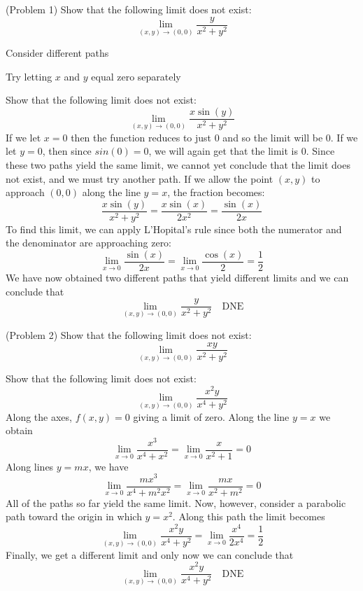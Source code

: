 \documentclass[handout]{ximera}
\begin{document}
\begin{problem}(Problem 1)
Show that the following limit does not exist:
\[
\lim_{(x,y) \to (0,0)} \frac{y}{x^2 + y^2}
\]
\begin{hint}
Consider different paths
\end{hint}
\begin{hint}
Try letting $x$ and $y$ equal zero separately
\end{hint}
\end{problem}

\begin{example}[Example 2]
Show that the following limit does not exist:
\[
\lim_{(x,y) \to (0,0)} \frac{x\sin(y)}{x^2 + y^2}
\]
If we let $x = 0$ then the function reduces to just $0$ and so the limit will be $0$. If we let $y = 0$, then since $sin (0) = 0$, we will again get that the limit is $0$.
Since these two paths yield the same limit, we cannot yet conclude that the limit does not exist, and we must try another path.
If we allow the point $(x,y)$ to approach $(0,0)$ along the line $y = x$, the fraction becomes:
\[
\frac{x\sin(y)}{x^2 + y^2} = \frac{x\sin(x)}{2x^2} = \frac{\sin(x)}{2x}
\]
To find this limit, we can apply L'Hopital's rule since both the numerator and the denominator are approaching zero:
\[
\lim_{x \to 0} \frac{\sin(x)}{2x} = \lim_{x \to 0} \frac{\cos(x)}{2} = \frac12
\]
We have now obtained two different paths that yield different limits and we can conclude that
\[
\lim_{(x,y) \to (0,0)} \frac{y}{x^2 + y^2} \quad \text{DNE}
\]
\end{example}

\begin{problem}(Problem 2)
Show that the following limit does not exist:
\[
\lim_{(x,y) \to (0,0)} \frac{xy}{x^2 + y^2}
\]
\end{problem}

\begin{example}[Example 3]
Show that the following limit does not exist:
\[
\lim_{(x,y) \to (0,0)} \frac{x^2y}{x^4 + y^2}
\]
Along the axes, $f(x,y) = 0$ giving a limit of zero. Along the line $y = x$ we obtain 
\[
\lim_{x\to 0} \frac{x^3}{x^4 + x^2} = \lim_{x\to 0} \frac{x}{x^2 + 1} = 0
\]
Along lines $ y = mx$, we have
\[
\lim_{x\to 0} \frac{mx^3}{x^4 + m^2x^2} = \lim_{x\to 0} \frac{mx}{x^2 + m^2} = 0
\]
All of the paths so far yield the same limit.  Now, however, consider a parabolic path toward the origin in which $y = x^2$.
Along this path the limit becomes
\[
\lim_{(x,y) \to (0,0)} \frac{x^2y}{x^4 + y^2} =  \lim_{x \to 0} \frac{x^4}{2x^4} = \frac12
\]
Finally, we get a different limit and only now we can conclude that
\[
\lim_{(x,y) \to (0,0)} \frac{x^2y}{x^4 + y^2} \quad \text{DNE}
\]

\end{example}
\end{document}
